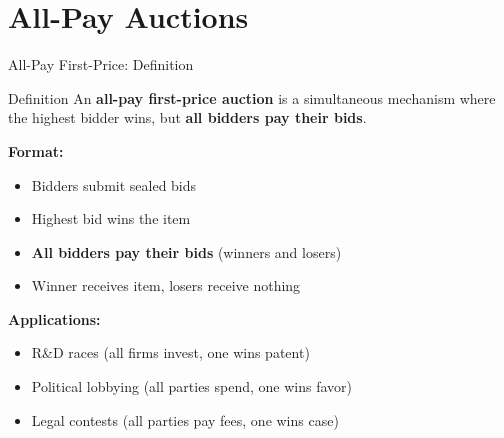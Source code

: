 \documentclass[xcolor={x11names}, aspectratio=169 ]{beamer}
\begin{document}
\section{All-Pay Auctions}

\begin{frame}{All-Pay First-Price: Definition}
\begin{block}{Definition}
An \textbf{all-pay first-price auction} is a simultaneous mechanism where the highest bidder wins, but \textbf{all bidders pay their bids}.
\end{block}

\textbf{Format:}
\begin{itemize}
\item Bidders submit sealed bids
\item Highest bid wins the item
\item \textbf{All bidders pay their bids} (winners and losers)
\item Winner receives item, losers receive nothing
\end{itemize}

\textbf{Applications:}
\begin{itemize}
  \item R\&D races (all firms invest, one wins patent)
  \item Political lobbying (all parties spend, one wins favor)
  \item Legal contests (all parties pay fees, one wins case)
\end{itemize}
\end{frame}
\end{document}
